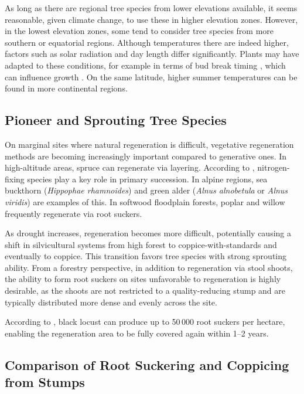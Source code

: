 As long as there are regional tree species from lower elevations available, it seems reasonable, given climate change, to use these in higher elevation zones. However, in the lowest elevation zones, some tend to consider tree species from more southern or equatorial regions. Although temperatures there are indeed higher, factors such as solar radiation and day length differ significantly. Plants may have adapted to these conditions, for example in terms of bud break timing \citep{phillips1941tageslaenge}, which can influence growth \citep{jester1939zuwachsUndTageslaenge}. On the same latitude, higher summer temperatures can be found in more continental regions.


\subsection{Pioneer and Sprouting Tree Species}

On marginal sites where natural regeneration is difficult, vegetative regeneration methods are becoming increasingly important compared to generative ones. In high-altitude areas, spruce can regenerate via layering. According to \citet{boring1984robinie}, nitrogen-fixing species play a key role in primary succession. In alpine regions, sea buckthorn (\emph{Hippophae rhamnoides}) and green alder (\emph{Alnus alnobetula} or \emph{Alnus viridis}) are examples of this. In softwood floodplain forests, poplar and willow frequently regenerate via root suckers.

As drought increases, regeneration becomes more difficult, potentially causing a shift in silvicultural systems from high forest to coppice-with-standards and eventually to coppice. This transition favors tree species with strong sprouting ability. From a forestry perspective, in addition to regeneration via stool shoots, the ability to form root suckers on sites unfavorable to regeneration is highly desirable, as the shoots are not restricted to a quality-reducing stump and are typically distributed more dense and evenly across the site.

According to \citet{nicolescu2019robinie}, black locust can produce up to 50\,000 root suckers per hectare, enabling the regeneration area to be fully covered again within 1–2 years.

\subsection{Comparison of Root Suckering and Coppicing from Stumps}


